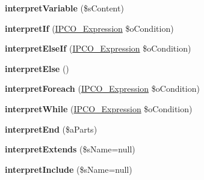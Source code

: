 \begin{DoxyCompactItemize}
\item 
\hypertarget{class_i_p_c_o___parser_a0aadb756968220b05b083341f6762467}{{\bfseries interpret\-Variable} (\$s\-Content)}\label{class_i_p_c_o___parser_a0aadb756968220b05b083341f6762467}

\item 
\hypertarget{class_i_p_c_o___parser_a52f3cd134918ccfb422b024c5bab4da8}{{\bfseries interpret\-If} (\hyperlink{class_i_p_c_o___expression}{I\-P\-C\-O\-\_\-\-Expression} \$o\-Condition)}\label{class_i_p_c_o___parser_a52f3cd134918ccfb422b024c5bab4da8}

\item 
\hypertarget{class_i_p_c_o___parser_a29569e3262efe4ffd9c26ded3b29f4bd}{{\bfseries interpret\-Else\-If} (\hyperlink{class_i_p_c_o___expression}{I\-P\-C\-O\-\_\-\-Expression} \$o\-Condition)}\label{class_i_p_c_o___parser_a29569e3262efe4ffd9c26ded3b29f4bd}

\item 
\hypertarget{class_i_p_c_o___parser_af38893359cbb65893ff2b9d7304a1440}{{\bfseries interpret\-Else} ()}\label{class_i_p_c_o___parser_af38893359cbb65893ff2b9d7304a1440}

\item 
\hypertarget{class_i_p_c_o___parser_ac18f73513f81d3352b16bde328c96aac}{{\bfseries interpret\-Foreach} (\hyperlink{class_i_p_c_o___expression}{I\-P\-C\-O\-\_\-\-Expression} \$o\-Condition)}\label{class_i_p_c_o___parser_ac18f73513f81d3352b16bde328c96aac}

\item 
\hypertarget{class_i_p_c_o___parser_aa47df893291facf5aa3319c716266c3b}{{\bfseries interpret\-While} (\hyperlink{class_i_p_c_o___expression}{I\-P\-C\-O\-\_\-\-Expression} \$o\-Condition)}\label{class_i_p_c_o___parser_aa47df893291facf5aa3319c716266c3b}

\item 
\hypertarget{class_i_p_c_o___parser_afaa436efebe731c32fb807f63f7de706}{{\bfseries interpret\-End} (\$a\-Parts)}\label{class_i_p_c_o___parser_afaa436efebe731c32fb807f63f7de706}

\item 
\hypertarget{class_i_p_c_o___parser_a205fe7657ea60d88aa3df36da955ef4a}{{\bfseries interpret\-Extends} (\$s\-Name=null)}\label{class_i_p_c_o___parser_a205fe7657ea60d88aa3df36da955ef4a}

\item 
\hypertarget{class_i_p_c_o___parser_ab11ec0ac6216170d007799f50603ee6c}{{\bfseries interpret\-Include} (\$s\-Name=null)}\label{class_i_p_c_o___parser_ab11ec0ac6216170d007799f50603ee6c}


\end{DoxyCompactItemize}
